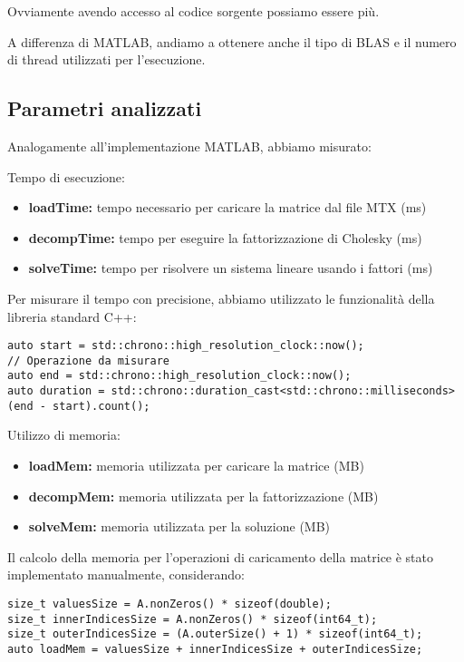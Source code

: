 Ovviamente avendo accesso al codice sorgente possiamo essere più.

A differenza di MATLAB, andiamo a ottenere anche il tipo di BLAS e il numero di thread utilizzati per l'esecuzione.

\subsection{Parametri analizzati} 

Analogamente all'implementazione MATLAB, abbiamo misurato:

Tempo di esecuzione:
\begin{itemize}
    \item \textbf{loadTime:} tempo necessario per caricare la matrice dal file MTX (ms)
    \item \textbf{decompTime:} tempo per eseguire la fattorizzazione di Cholesky (ms)
    \item \textbf{solveTime:} tempo per risolvere un sistema lineare usando i fattori (ms)
\end{itemize}

Per misurare il tempo con precisione, abbiamo utilizzato le funzionalità della libreria standard C++:
\begin{verbatim}
auto start = std::chrono::high_resolution_clock::now();
// Operazione da misurare
auto end = std::chrono::high_resolution_clock::now();
auto duration = std::chrono::duration_cast<std::chrono::milliseconds>(end - start).count();
\end{verbatim}

Utilizzo di memoria:
\begin{itemize}
    \item \textbf{loadMem:} memoria utilizzata per caricare la matrice (MB)
    \item \textbf{decompMem:} memoria utilizzata per la fattorizzazione (MB)
    \item \textbf{solveMem:} memoria utilizzata per la soluzione (MB)
\end{itemize}

Il calcolo della memoria per l'operazioni di caricamento della matrice è stato implementato manualmente, considerando:
\begin{verbatim}
size_t valuesSize = A.nonZeros() * sizeof(double);
size_t innerIndicesSize = A.nonZeros() * sizeof(int64_t);
size_t outerIndicesSize = (A.outerSize() + 1) * sizeof(int64_t);
auto loadMem = valuesSize + innerIndicesSize + outerIndicesSize;
\end{verbatim}

